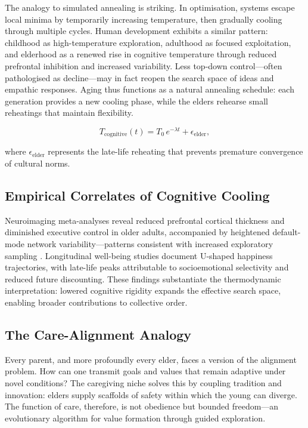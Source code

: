 \documentclass[12pt,a4paper]{article}
\begin{document}
The analogy to simulated annealing is striking.
In optimisation, systems escape local minima by temporarily increasing temperature,
then gradually cooling through multiple cycles.
Human development exhibits a similar pattern:
childhood as high-temperature exploration,
adulthood as focused exploitation,
and elderhood as a renewed rise in cognitive temperature
through reduced prefrontal inhibition and increased variability.
Less top-down control---often pathologised as decline---may in fact reopen
the search space of ideas and empathic responses.
Aging thus functions as a natural annealing schedule:
each generation provides a new cooling phase,
while the elders rehearse small reheatings that maintain flexibility.

\[
T_{\text{cognitive}}(t) =
T_0\, e^{-\lambda t} + \epsilon_{\text{elder}},
\]

where \(\epsilon_{\text{elder}}\) represents the late-life reheating that prevents
premature convergence of cultural norms.

\subsection{Empirical Correlates of Cognitive Cooling}

Neuroimaging meta-analyses reveal reduced prefrontal cortical thickness 
and diminished executive control in older adults, 
accompanied by heightened default-mode network variability---patterns 
consistent with increased exploratory sampling \citep{carstensen2011emotional}. 
Longitudinal well-being studies document U-shaped happiness trajectories, 
with late-life peaks attributable to socioemotional selectivity 
and reduced future discounting. These findings substantiate the thermodynamic 
interpretation: lowered cognitive rigidity expands the effective 
search space, enabling broader contributions to collective order.

\subsection{The Care-Alignment Analogy}

Every parent, and more profoundly every elder,
faces a version of the alignment problem.
How can one transmit goals and values that remain adaptive under novel conditions?
The caregiving niche solves this by coupling tradition and innovation:
elders supply scaffolds of safety within which the young can diverge.
The function of care, therefore, is not obedience but bounded freedom---an
evolutionary algorithm for value formation through guided exploration.
\end{document}
